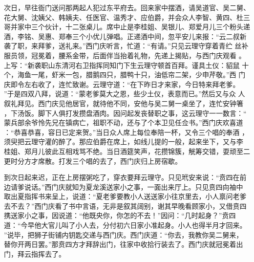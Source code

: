 次日，早往衙门送问那两起人犯过东平府去。回来家中摆酒，请吴道官、吴二舅、
花大舅、沈姨父、韩姨夫、任医官、温秀才、应伯爵，并会众人李智、黄四、杜三
哥并家中三个伙计，十二张桌儿。席中止是李桂姐、吴银儿、郑爱月儿三个粉头递
酒，李铭、吴惠、郑奉三个小优儿弹唱。正递酒中间，忽平安儿来报：“云二叔新
袭了职，来拜爹，送礼来。”西门庆听言，忙道：“有请。”只见云理守穿着青纻
丝补服员领，冠冕着，腰系金带，后面伴当抬着礼物，先递上揭贴，与西门庆观看
。上写：“新袭职山东清河右卫指挥同知门下生云理守顿首百拜。谨具土仪：貂鼠
十个，海鱼一尾，虾米一包，腊鹅四只，腊鸭十只，油低帘二架，少申芹敬。”西
门庆即令左右收了，连忙致谢。云理守道：“在下昨日才来家，今日特来拜老爹。
”于是四双八拜，说道：“蒙老爹莫大之恩，些少土仪，表意而已。”然后又与众
人叙礼拜见。西门庆见他居官，就待他不同，安他与吴二舅一桌坐了，连忙安钟箸
，下汤饭。脚下人俱打发攒盘酒肉。因问起发丧替职之事，这云理守一一数言：“
蒙兵部余爷怜先兄在镇病亡，祖职不动，还与了个本卫见任佥书。”西门庆欢喜道
：“恭喜恭喜，容日已定来贺。”当日众人席上每位奉陪一杯，又令三个唱的奉酒
，须臾把云理守灌的醉了。那应伯爵在席上，如线儿提的一般，起来坐下，又与李
桂姐、郑月儿彼此互相戏骂不绝。当日酒筵笑声，花攒锦簇，觥筹交错，耍顽至二
更时分方才席散。打发三个唱的去了，西门庆归上房宿歇。

到次日起来迟，正在上房摆粥吃了，穿衣要拜云理守。只见玳安来说：“贲四在前
边请爹说话。”西门庆就知为夏龙溪送家小之事，一面出来厅上。只见贲四向袖中
取出夏指挥书来呈上，说道：“夏老爹要教小人送送家小往京里去，小人禀问老爹
去不去？”西门庆看了书中言语，无非是叙其阔别，谢其早晚看顾家小，又借贲四
携送家小之事，因说道：“他既央你，你怎的不去！”因问：“几时起身？”贲四
道：“今早他大官儿叫了小人去，分付初六日家小准起身。小人也得半月才回来。
”说毕，把狮子街铺内钥匙交递与西门庆。西门庆道：“你去，我教你吴二舅来，
替你开两日罢。”那贲四方才拜辞出门，往家中收拾行装去了。西门庆就冠冕着出
门，拜云指挥去了。


